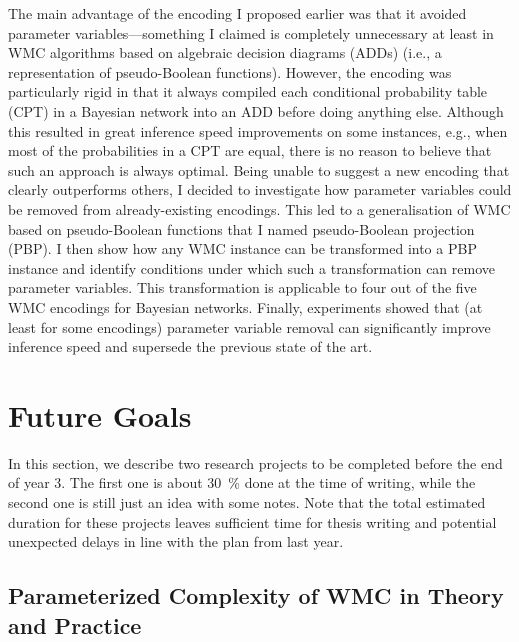 \documentclass{article}
\begin{document}
\begin{description}
  The main advantage of the encoding I proposed earlier was that it avoided
  parameter variables---something I claimed is completely unnecessary at
  least in WMC algorithms based on algebraic decision diagrams (ADDs) (i.e., a
  representation of pseudo-Boolean functions). However, the encoding was
  particularly rigid in that it always compiled each conditional probability
  table (CPT) in a Bayesian network into an ADD before doing anything else.
  Although this resulted in great inference speed improvements on some
  instances, e.g., when most of the probabilities in a CPT are equal, there is
  no reason to believe that such an approach is always optimal. Being unable to
  suggest a new encoding that clearly outperforms others, I decided to
  investigate how parameter variables could be removed from already-existing
  encodings. This led to a generalisation of WMC based on pseudo-Boolean
  functions that I named pseudo-Boolean projection (PBP). I then show how any
  WMC instance can be transformed into a PBP instance and identify conditions
  under which such a transformation can remove parameter variables. This
  transformation is applicable to four out of the five WMC encodings for
  Bayesian networks. Finally, experiments showed that (at least for some
  encodings) parameter variable removal can significantly improve inference
  speed and supersede the previous state of the art.
\end{description}

\section{Future Goals} \label{sec:future}

In this section, we describe two research projects to be completed before the
end of year 3. The first one is about \SI{30}{\percent} done at the time of
writing, while the second one is still just an idea with some notes. Note that
the total estimated duration for these projects leaves sufficient time for
thesis writing and potential unexpected delays in line with the plan from last
year.

\subsection{Parameterized Complexity of WMC in Theory and
  Practice} \label{sec:1}
\end{document}
